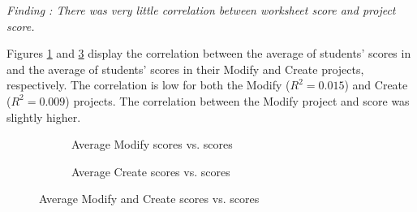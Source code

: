 {
\textit{Finding : There was very little correlation between \ts{} worksheet score and project score.}

Figures \ref{fig:avg_modify} and \ref{fig:avg_create} display the correlation between the average of students' scores in \ts{} and the average of students' scores in their Modify and Create projects, respectively. The correlation is low for both the Modify (\begin{math}R^2 = 0.015\end{math}) and Create (\begin{math}R^2 = 0.009\end{math}) projects. The correlation between the Modify project and \ts{} score was slightly higher. 

\begin{figure}
     \centering
     \begin{subfigure}{0.49\textwidth}
        \caption{Average Modify scores vs. \ts{} scores}
        \label{fig:avg_modify}
    \end{subfigure}
    \begin{subfigure}{0.49\textwidth}
        \caption{Average Create scores vs. \ts{} scores}
        \label{fig:avg_create}
    \end{subfigure}
    
    \caption{Average Modify and Create scores vs. \ts{} scores}
\end{figure}


} %

